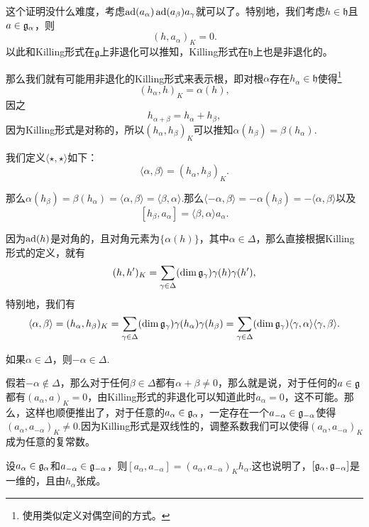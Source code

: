 这个证明没什么难度，考虑$\operatorname{ad}(a_\alpha) \operatorname{ad}(a_\beta) a_\gamma$就可以了。特别地，我们考虑$h\in \mathfrak{h}$且$a\in {\mathfrak{g}}_\alpha$，则
\[
	(h,a_\alpha)_K=0.
\]
以此和Killing形式在$\mathfrak{g}$上非退化可以推知，Killing形式在$\mathfrak{h}$上也是非退化的。

那么我们就有可能用非退化的Killing形式来表示根，即对根$\alpha$存在$h_\alpha\in\mathfrak{h}$使得\footnote{使用类似定义对偶空间的方式。}
\[
	(h_\alpha,h)_K=\alpha(h),
\]
因之
\[
	h_{\alpha+\beta}=h_\alpha+h_\beta,
\]
因为Killing形式是对称的，所以$(h_\alpha,h_\beta)_K$可以推知$\alpha(h_\beta)=\beta(h_\alpha)$.

\para 我们定义$\langle \star,\star \rangle$如下：
\[
	\langle \alpha,\beta \rangle=(h_\alpha,h_\beta)_K.
\]

那么$\alpha(h_\beta)=\beta(h_\alpha)=\langle \alpha,\beta \rangle=\langle \beta,\alpha \rangle$.那么$\langle -\alpha,\beta \rangle=-\alpha(h_\beta)=-\langle \alpha,\beta \rangle$以及
\[
	[h_\beta,a_\alpha]=\langle \beta,\alpha \rangle a_\alpha.
\]

因为$\operatorname{ad}(h)$是对角的，且对角元素为$\{\alpha(h)\}$，其中$\alpha\in\Delta$，那么直接根据Killing形式的定义，就有
\[
	(h,h')_K=\sum_{\gamma \in \Delta}(\dim {\mathfrak{g}}_\gamma)\gamma(h)\gamma(h'),
\]
特别地，我们有
\[
	\langle \alpha,\beta \rangle=(h_\alpha,h_\beta)_K=\sum_{\gamma \in \Delta}(\dim {\mathfrak{g}}_\gamma)\gamma(h_\alpha)\gamma(h_\beta)=\sum_{\gamma \in \Delta}(\dim {\mathfrak{g}}_\gamma)\langle \gamma,\alpha\rangle\langle \gamma,\beta\rangle.
\]


\pro 如果$\alpha\in\Delta$，则$-\alpha\in\Delta$.

假若$-\alpha\notin\Delta$，那么对于任何$\beta\in\Delta$都有$\alpha+\beta\neq 0$，那么就是说，对于任何的$a\in {\mathfrak{g}}$都有$(a_\alpha,a)_K=0$，由Killing形式的非退化可以知道此时$a_\alpha=0$，这不可能。那么，这样也顺便推出了，对于任意的$a_\alpha\in{\mathfrak{g}}_{\alpha}$，一定存在一个$a_{-\alpha}\in{\mathfrak{g}}_{-\alpha}$使得$(a_\alpha,a_{-\alpha})_K\neq 0$.因为Killing形式是双线性的，调整系数我们可以使得$(a_\alpha,a_{-\alpha})_K$成为任意的复常数。


\pro 设$a_\alpha \in {\mathfrak{g}}_\alpha$和$a_{-\alpha} \in {\mathfrak{g}}_{-\alpha}$，则$[a_{\alpha},a_{-\alpha}]=(a_{\alpha},a_{-\alpha})_Kh_\alpha$.这也说明了，$[{\mathfrak{g}}_{\alpha},{\mathfrak{g}}_{-\alpha}]$是一维的，且由$h_\alpha$张成。


